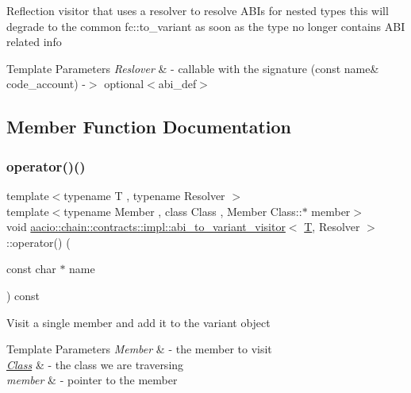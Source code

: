 Reflection visitor that uses a resolver to resolve A\+B\+Is for nested types this will degrade to the common fc\+::to\+\_\+variant as soon as the type no longer contains A\+BI related info


\begin{DoxyTemplParams}{Template Parameters}
{\em Reslover} & -\/ callable with the signature (const name\& code\+\_\+account) -\/$>$ optional$<$abi\+\_\+def$>$ \\
\hline
\end{DoxyTemplParams}


\subsection{Member Function Documentation}
\mbox{\label{classaacio_1_1chain_1_1contracts_1_1impl_1_1abi__to__variant__visitor_ad8922a03f91656c01dfd7e4324e778b3}} 
\subsubsection{\texorpdfstring{operator()()}{operator()()}}
{\footnotesize\ttfamily template$<$typename T , typename Resolver $>$ \\
template$<$typename Member , class Class , Member Class\+::$\ast$ member$>$ \\
void \mbox{\hyperlink{classaacio_1_1chain_1_1contracts_1_1impl_1_1abi__to__variant__visitor}{aacio\+::chain\+::contracts\+::impl\+::abi\+\_\+to\+\_\+variant\+\_\+visitor}}$<$ \mbox{\hyperlink{struct_t}{T}}, Resolver $>$\+::operator() (\begin{DoxyParamCaption}\item[{const char $\ast$}]{name }\end{DoxyParamCaption}) const\hspace{0.3cm}{\ttfamily [inline]}}

Visit a single member and add it to the variant object 
\begin{DoxyTemplParams}{Template Parameters}
{\em Member} & -\/ the member to visit \\
\hline
{\em \mbox{\hyperlink{class_class}{Class}}} & -\/ the class we are traversing \\
\hline
{\em member} & -\/ pointer to the member \\
\hline
\end{DoxyTemplParams}

